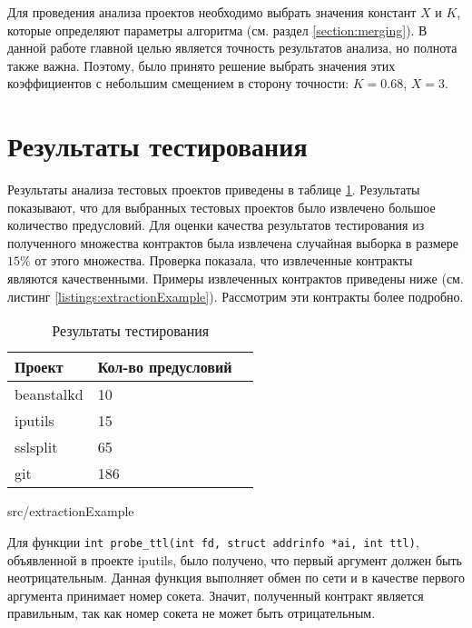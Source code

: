 Для проведения анализа проектов необходимо выбрать значения констант $X$ и $K$, которые определяют параметры алгоритма (см. раздел \ref{section:merging}). В данной работе главной целью является точность результатов анализа, но полнота также важна. Поэтому, было принято решение выбрать значения этих коэффициентов с небольшим смещением в сторону точности: $K=0.68$, $X=3$.

\section{Результаты тестирования}
Результаты анализа тестовых проектов приведены в таблице \ref{table:testing}. Результаты показывают, что для выбранных тестовых проектов было извлечено большое количество предусловий. Для оценки качества результатов тестирования из полученного множества контрактов была извлечена случайная выборка в размере $15\%$ от этого множества. Проверка показала, что извлеченные контракты являются качественными. Примеры извлеченных контрактов приведены ниже (см. листинг \ref{listings:extractionExample}). Рассмотрим эти контракты более подробно.

\begin{table}
	\caption{Результаты тестирования}
	\begin{center}
	\begin{tabular}{|l|l|l|}
	\hline 
	\textbf{Проект} & \textbf{Кол-во предусловий}	\\ 
	\hline 
	beanstalkd & 10 \\ 
	\hline 
	iputils & 15  \\ 
	\hline 
	sslsplit & 65 \\
	\hline 
	git & 186 \\ 
	\hline 
	\end{tabular} 
	\end{center}
	\label{table:testing}
\end{table}


{src/extractionExample}

Для функции \texttt{int probe_ttl(int fd, struct addrinfo *ai, int ttl)}, объявленной в проекте iputils, было получено, что первый аргумент должен быть неотрицательным. Данная функция выполняет обмен по сети и в качестве первого аргумента принимает номер сокета. Значит, полученный контракт является правильным, так как номер сокета не может быть отрицательным.


